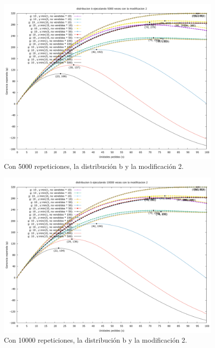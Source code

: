 \documentclass[12pt, spanish]{article}
\begin{document}
\begin{figure}[H]
	\centering
	\includegraphics[scale = 0.2]{prob_b/datos_b_5000_2.png}
	\caption{Con 5000 repeticiones, la distribución b y la modificación 2.}
	\label{fig:ej1_a_5000}

\end{figure}


\begin{figure}[H]
	\centering
	\includegraphics[scale = 0.2]{prob_b/datos_b_10000_2.png}
	\caption{Con 10000 repeticiones, la distribución b y la modificación 2.}
	\label{fig:ej1_a_10000}

\end{figure}
\end{document}
